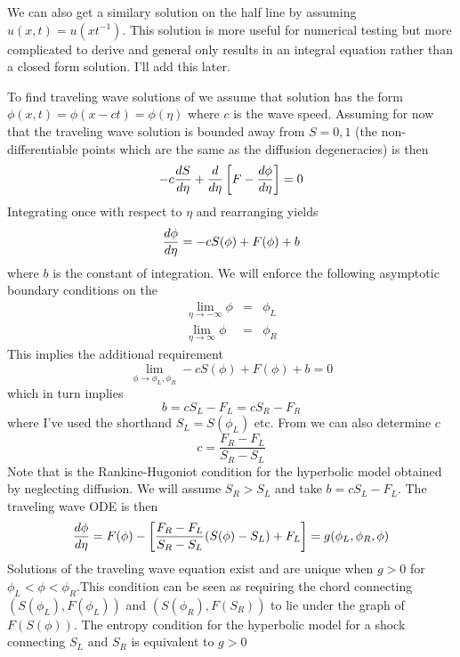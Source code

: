 \documentclass[10pt,dvips,twoside,reqno]{amsart}
\begin{document}
 We can also get a similary solution on
the half line by assuming $u(x,t) = u(xt^{-1})$. This solution is more
useful for numerical testing but more complicated to derive and
general only results in an integral equation rather than a closed form
solution. I'll add this later.

 To find traveling wave solutions of
 we assume that solution has the form $\phi(x,t) = \phi(x -
ct) = \phi(\eta)$ where $c$ is the wave speed. Assuming for now that
the traveling wave solution is bounded away from $S=0,1$ (the
non-differentiable points which are the same as the diffusion
degeneracies)  is then
\begin{equation}
  \label{eq:travWave}
  -c \frac{d {S}}{d {\eta}} + \frac{d {}}{d {\eta}}\left[ F - \frac{d {\phi}}{d {\eta}} \right] = 0
\end{equation}
Integrating once with respect to $\eta$ and rearranging yields
\begin{equation}
  \label{eq:travWavOde}
  \frac{d {\phi}}{d {\eta}}  = -c S(\phi) + F(\phi) + b
\end{equation}
where $b$ is the constant of integration. We will enforce the following asymptotic boundary conditions on the 
\begin{eqnarray}
  \label{eq:odeBC}
  \lim_{\eta \rightarrow - \infty} \phi &=& \phi_{L} \\
\lim_{\eta \rightarrow \infty} \phi &=& \phi_{R} 
\end{eqnarray}
This implies the additional requirement
\begin{equation}
  \label{eq:lim}
  \lim_{\phi \rightarrow \phi_L,\phi_R} -c S(\phi) + F(\phi) + b = 0
\end{equation}
which in turn implies
\begin{equation}
  \label{eq:intConst}
  b = c S_L - F_L = c S_R - F_R
\end{equation}
where I've used the shorthand $S_L = S(\phi_L)$ etc. From  we can also determine $c$
\begin{equation}
  \label{eq:waveSpeed}
  c = \frac{F_R - F_L}{S_R - S_L}
\end{equation}
Note that  is the Rankine-Hugoniot condition for the
hyperbolic model obtained by neglecting diffusion.  We will assume
$S_R > S_L$ and take $b=c S_L - F_L$. The traveling wave ODE is then
\begin{equation}
  \label{eq:odeFinal}
   \frac{d {\phi}}{d {\eta}}  = F(\phi) - \left[ \frac{F_R - F_L}{S_R - S_L} (S(\phi) - S_L) + F_L\right] = g(\phi_L,\phi_R,\phi)
\end{equation}
Solutions of the traveling wave equation exist and are unique when $g
> 0$ for $\phi_L < \phi < \phi_R$.This condition can be seen as
requiring the chord connecting $(S(\phi_L),F(\phi_L))$ and
$(S(\phi_R),F(S_R))$ to lie under the graph of $F(S(\phi))$. The
entropy condition for the hyperbolic model for a shock connecting
$S_L$ and $S_R$ is equivalent to $g>0$
\end{document}
